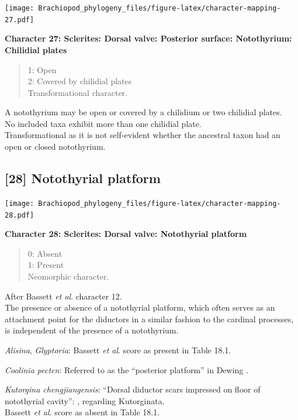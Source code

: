 \documentclass[openany]{book}
\theoremstyle{definition}
\theoremstyle{definition}
\theoremstyle{definition}
\theoremstyle{remark}
\begin{document}
\texttt{[image: Brachiopod\_phylogeny\_files/figure-latex/character-mapping-27.pdf]}

\textbf{Character 27: Sclerites: Dorsal valve: Posterior surface:
Notothyrium: Chilidial plates}

\begin{quote}
1: Open\\
2: Covered by chilidial plates\\
Transformational character.
\end{quote}

A notothyrium may be open or covered by a chilidium or two chilidial
plates.\\
No included taxa exhibit more than one chilidial plate.\\
Transformational as it is not self-evident whether the ancestral taxon
had an open or closed notothyrium.

\subsection*{{[}28{]} Notothyrial platform}\label{notothyrial-platform}

\texttt{[image: Brachiopod\_phylogeny\_files/figure-latex/character-mapping-28.pdf]}

\textbf{Character 28: Sclerites: Dorsal valve: Notothyrial platform}

\begin{quote}
0: Absent\\
1: Present\\
Neomorphic character.
\end{quote}

After Bassett \emph{et al}.
\citeyearpar{Bassett2001Functionalmorphology} character 12.\\
The presence or absence of a notothyrial platform, which often serves as
an attachment point for the diductors in a similar fashion to the
cardinal processes, is independent of the presence of a notothyrium.

\hypertarget{Alisina-coding-28}{}
\emph{Alisina}, \emph{Glyptoria}: Bassett \emph{et al}.
\citeyearpar{Bassett2001Functionalmorphology} score as present in Table
18.1.

\hypertarget{Coolinia_pecten-coding-28}{}
\emph{Coolinia pecten}: Referred to as the ``posterior platform'' in
Dewing \citeyearpar{Dewing2001Hingemodifications}.

\hypertarget{Kutorgina_chengjiangensis-coding-28}{}
\emph{Kutorgina chengjiangensis}: ``Dorsal diductor scars impressed on
floor of notothyrial cavity'':
\citet{Williams2000LinguliformeaCraniiformea}, regarding Kutorginata.\\
Bassett \emph{et al}. \citeyearpar{Bassett2001Functionalmorphology}
score as absent in Table 18.1.
\end{document}
